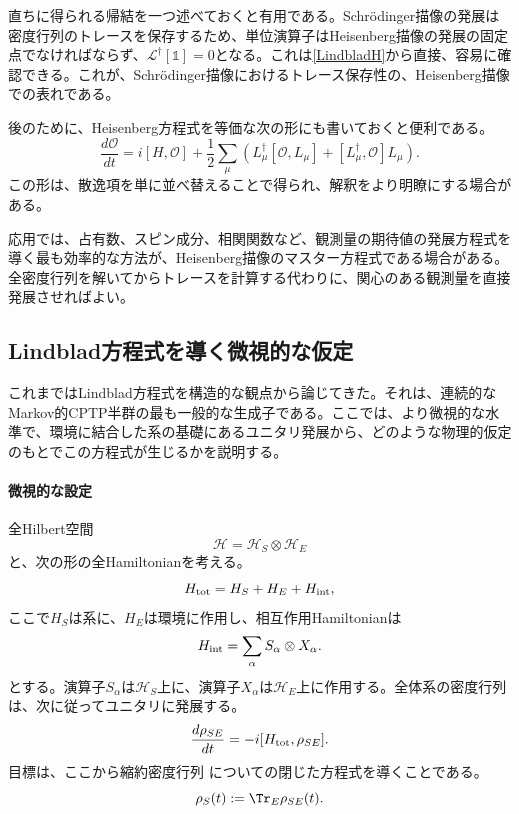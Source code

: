 \documentclass[a4paper,11pt,oneside]{article}
\theoremstyle{definition}
\numberwithin{equation}{section}
\renewcommand{\O}{\mathcal{O}}
\begin{document}
直ちに得られる帰結を一つ述べておくと有用である。Schr\"odinger描像の発展は密度行列のトレースを保存するため、単位演算子はHeisenberg描像の発展の固定点でなければならず、$ \mathcal L^\dagger[\mathds 1]=0$となる。これは\eqref{LindbladH}から直接、容易に確認できる。これが、Schr\"odinger描像におけるトレース保存性の、Heisenberg描像での表れである。



後のために、Heisenberg方程式を等価な次の形にも書いておくと便利である。
\begin{equation}
\frac{d\O}{dt}
=
i[H,\O]
+
\frac12
\sum_\mu
\left(
L_\mu^\dagger[\O,L_\mu]
+
[L_\mu^\dagger,\O]L_\mu
\right) .
\end{equation}
この形は、散逸項を単に並べ替えることで得られ、解釈をより明瞭にする場合がある。



応用では、占有数、スピン成分、相関関数など、観測量の期待値の発展方程式を導く最も効率的な方法が、Heisenberg描像のマスター方程式である場合がある。全密度行列を解いてからトレースを計算する代わりに、関心のある観測量を直接発展させればよい。





\subsection{Lindblad方程式を導く微視的な仮定}



これまではLindblad方程式を構造的な観点から論じてきた。それは、連続的なMarkov的CPTP半群の最も一般的な生成子である。ここでは、より微視的な水準で、環境に結合した系の基礎にあるユニタリ発展から、どのような物理的仮定のもとでこの方程式が生じるかを説明する。



\paragraph{微視的な設定}



全Hilbert空間
\begin{equation}
\mathcal H = \mathcal H_S \otimes \mathcal H_E
\end{equation}
と、次の形の全Hamiltonianを考える。
\begin{equation}\label{Htotmicro}
H_{\rm tot} = H_S + H_E + H_{\rm int} ,
\end{equation}
ここで$H_S$は系に、$H_E$は環境に作用し、相互作用Hamiltonianは
\begin{equation}\label{Hintmicro}
H_{\rm int} = \sum_\alpha S_\alpha \otimes X_\alpha .
\end{equation}
とする。演算子$S_\alpha$は$\mathcal H_S$上に、演算子$X_\alpha$は$\mathcal H_E$上に作用する。全体系の密度行列は、次に従ってユニタリに発展する。
\begin{equation}
\frac{d\rho_{SE}}{dt} = -i[H_{\rm tot},\rho_{SE}] .
\end{equation}
目標は、ここから縮約密度行列
についての閉じた方程式を導くことである。
\begin{equation}
\rho_S(t) := \Tr_E \rho_{SE}(t) .
\end{equation}
\end{document}
